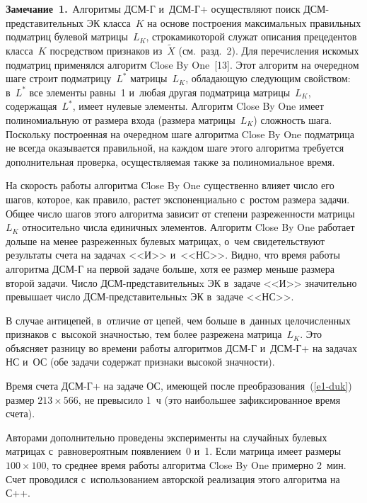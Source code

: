 \begin{multicols}{2}
  \smallskip
  

  
  \noindent
  \textbf{Замечание~1.}\ Алгоритмы ДСМ-Г и~ДСМ-Г+ осуществляют поиск 
ДСМ-представительных ЭК класса~$K$ на основе построения максимальных 
правильных подматриц булевой матрицы~$L_K$, строками\linebreak которой служат 
описания прецедентов класса~$K$ посредством признаков из~$\tilde{X}$ (см.\ 
разд.~2). Для пе\-ре\-чис\-ле\-ния искомых под\-мат\-риц применялся алгоритм Close By 
One~[13]. Этот алгоритм на очередном шаге строит под\-мат\-ри\-цу~$L^*$ 
матрицы~$L_K$, обладающую следующим свойством: в~$L^*$ все элементы 
равны~1 и~любая другая подматрица матрицы~$L_K$, содержащая~$L^*$, 
имеет нулевые элементы. Алгоритм Close By One имеет полиномиальную от 
размера входа (размера мат\-ри\-цы~$L_K$) слож\-ность шага. Поскольку 
по\-стро\-ен\-ная на очередном шаге алгоритма Close By One под\-мат\-ри\-ца не всегда 
оказывается правильной, на каждом шаге этого алгоритма требуется 
дополнительная проверка, осуществляемая также за полиномиальное время. 
  
  На скорость работы алгоритма Close By One существенно влияет число его 
шагов, которое, как правило, растет экспоненциально с~ростом размера задачи. 
Общее число шагов этого алгоритма зависит от степени разреженности 
матрицы~$L_K$ относительно числа единичных элементов. Алгоритм Close By 
One работает дольше на менее разреженных булевых матрицах, о~чем 
свидетельствуют результаты счета на задачах <<И>> и~<<НС>>. Видно, что 
время работы алгоритма ДСМ-Г на первой задаче больше, хотя ее размер 
меньше размера второй задачи. Число ДСМ-пред\-ста\-ви\-тель\-ныx ЭК 
в~задаче <<И>> значительно превышает число ДСМ-пред\-ста\-ви\-тель\-ныx 
ЭК в~задаче <<НС>>. 
  
  В случае антицепей, в~отличие от цепей, чем больше в~данных 
целочисленных признаков с~высокой значностью, тем более разрежена 
матрица~$L_K$. Это объясняет разницу во времени работы алгоритмов ДСМ-Г и~ДСМ-Г+ на задачах НС и~ОС (обе задачи содержат признаки высокой 
значности).
  
  Время счета ДСМ-Г+ на задаче ОС, имеющей после  
преобразования~(\ref{e1-duk}) размер $213\times 566$, не превысило 1~ч (это 
наибольшее зафиксированное время счета).
  
  Авторами дополнительно проведены эксперименты на случайных булевых 
матрицах с~равновероятным появлением~0 и~1. Если матрица имеет размеры 
$100\times100$, то среднее время работы алгоритма Close By One примерно 
2~мин. Счет проводился с~использованием авторской реализация этого 
алгоритма на С++. 
  

\end{multicols}
